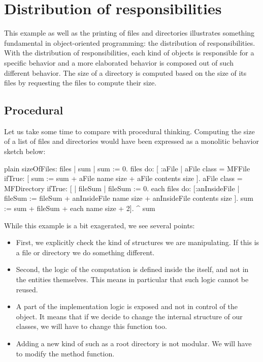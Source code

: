 \documentclass[10pt,twoside,english]{_support/latex/sbabook/sbabook}
\begin{document}
\section{Distribution of responsibilities}
This example as well as the printing of files and directories illustrates something fundamental in 
object-oriented programming: the distribution of responsibilities. With the distribution of responsibilities,  each kind of objects is responsible for a specific behavior and a more elaborated behavior is composed out of such different behavior. The size of a directory is computed based on the size of its files by requesting the files to compute their size. 
\subsection{Procedural}
Let us take some time to compare with procedural thinking. Computing the size of a list of files and directories would have been expressed as a monolitic behavior sketch below:

\begin{displaycode}{plain}
sizeOfFiles: files
	| sum | 
	sum := 0.
	files do: [ :aFile | 
		aFile class = MFFile
			ifTrue: [ sum := sum + aFile name size + aFile contents size ].
		aFile class = MFDirectory
			ifTrue: [ 
				| fileSum |
				fileSum := 0.
				each files do: [:anInsideFile | fileSum := fileSum + anInsideFile name size + anInsideFile contents size ].
				sum := sum + fileSum + each name size + 2].
	^ sum	
\end{displaycode}

While this example is a bit exagerated, we see several points:

\begin{itemize}
\item First, we explicitly check the kind of structures we are manipulating. If this is a file or directory we do something different.
\item Second, the logic of the computation is defined inside the  itself, and not in the entities themselves.   This means in particular that such logic cannot be reused.
\item A part of the implementation logic is exposed and not in control of the object. It means that if we decide to change the internal structure of our classes, we will have to change this function too.
\item Adding a new kind of such as a root directory is not modular. We will have to modify the method  function.
\end{itemize}
\end{document}
